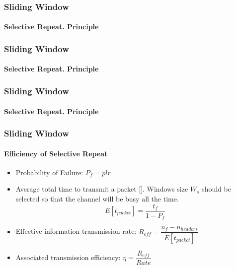 \begin{frame}		
	\frametitle{Sliding Window}
	\framesubtitle{Selective Repeat. Principle}
	
	\begin{figure}[H]
		\center{\texttt{[image: sr-1]}}
	\end{figure}
	
\end{frame}

\begin{frame}		
	\frametitle{Sliding Window}
	\framesubtitle{Selective Repeat. Principle}
	
	\begin{figure}[H]
		\center{\texttt{[image: sr-2]}}
	\end{figure}
	
\end{frame}

\begin{frame}		
	\frametitle{Sliding Window}
	\framesubtitle{Selective Repeat. Principle}
	
	\begin{figure}[H]
		\center{\texttt{[image: sr-3]}}
	\end{figure}
	
\end{frame}


\begin{frame}		
	\frametitle{Sliding Window}
	\framesubtitle{Efficiency of Selective Repeat}
	
	\begin{itemize}
		\item Probability of Failure: $P_f = plr$
		\item Average total time to transmit a packet [\cite{1}]. Windows size $W_s$ should be selected so that the channel will be busy all the time.
		$$E[t_{packet}] = \dfrac{ t_f }{1 - P_f}$$
		\item Effective information transmission rate: $R_{eff} =\dfrac{n_f - n_{headers}}{E[t_{packet}]} $
		\item Associated transmission efficiency: $\eta = \dfrac{R_{eff}}{Rate}$
\end{itemize}

\end{frame}


